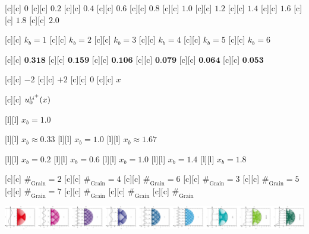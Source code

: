  [c][c] {\tiny $0$}
 [c][c] {\tiny $0.2$}
 [c][c] {\tiny $0.4$}
 [c][c] {\tiny $0.6$}
 [c][c] {\tiny $0.8$}
[c][c] {\tiny $1.0$}
[c][c] {\tiny $1.2$}
[c][c] {\tiny $1.4$}
[c][c] {\tiny $1.6$}
[c][c] {\tiny $1.8$}
[c][c] {\tiny $2.0$}



[c][c] {\tiny $k_{b} = 1$}
[c][c] {\tiny $k_{b} = 2$}
[c][c] {\tiny $k_{b} = 3$}
[c][c] {\tiny $k_{b} = 4$}
[c][c] {\tiny $k_{b} = 5$}
[c][c] {\tiny $k_{b} = 6$}

[c][c] {\tiny $\textbf{0.318}$}
[c][c] {\tiny $\textbf{0.159}$}
[c][c] {\tiny $\textbf{0.106}$}
[c][c] {\tiny $\textbf{0.079}$}
[c][c] {\tiny $\textbf{0.064}$}
[c][c] {\tiny $\textbf{0.053}$}

[c][c] {\tiny $-2$}
[c][c] {\tiny $+2$}
[c][c]   {\tiny $0$}
[c][c]   {\tiny $x$}

[c][c]  {\tiny $u_{0}^{\text{\tiny Li}^{\tiny +}}(x)$}

[l][l] {\tiny $x_{b} = 1.0$}

[l][l] {\tiny $x_{b} \approx 0.33$}
[l][l] {\tiny $x_{b} = 1.0$}
[l][l] {\tiny $x_{b} \approx 1.67$}

[l][l] {\tiny $x_{b} = 0.2$}
[l][l] {\tiny $x_{b} = 0.6$}
[l][l] {\tiny $x_{b} = 1.0$}
[l][l] {\tiny $x_{b} = 1.4$}
[l][l] {\tiny $x_{b} = 1.8$}

[c][c] {\tiny $\#_{\text{Grain}}=2$}
[c][c] {\tiny $\#_{\text{Grain}}=4$}
[c][c] {\tiny $\#_{\text{Grain}}=6$}
[c][c] {\tiny $\#_{\text{Grain}}=3$}
[c][c] {\tiny $\#_{\text{Grain}}=5$}
[c][c] {\tiny $\#_{\text{Grain}}=7$}
[c][c] {\tiny $\#_{\text{Grain}}$}
[c][c] {\tiny $\#_{\text{Grain}}$}
[c][c] {\tiny $\#_{\text{Grain}}$}

\includegraphics[width=1.0\textwidth]{characsin_rotate_semicircle_135246mix_horizontal.eps}